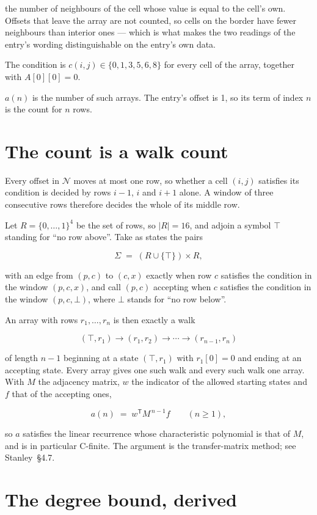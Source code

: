 \documentclass[11pt]{article}
\theoremstyle{definition}
\begin{document}
the number of neighbours of the cell whose value is equal to the cell's own. Offsets that leave the array are not counted, so cells on the border have fewer neighbours than interior ones --- which is what makes the two readings of the entry's wording distinguishable on the entry's own data.

The condition is $c(i,j) \in \{0, 1, 3, 5, 6, 8\}$ for every cell of the array, together with $A[0][0]=0$.

$a(n)$ is the number of such arrays. The entry's offset is 1, so its term of index $n$ is the count for $n$ rows.

\section{The count is a walk count}

Every offset in $\mathcal{N}$ moves at most one row, so whether a cell $(i,j)$ satisfies its condition is decided by rows $i-1$, $i$ and $i+1$ alone. A window of three consecutive rows therefore decides the whole of its middle row.

Let $R = \{0,\dots,1\}^{4}$ be the set of rows, so $|R| = 16$, and adjoin a symbol $\top$ standing for ``no row above''. Take as states the pairs

\[\Sigma \;=\; (R \cup \{\top\}) \times R,\]

with an edge from $(p,c)$ to $(c,x)$ exactly when row $c$ satisfies the condition in the window $(p,c,x)$, and call $(p,c)$ accepting when $c$ satisfies the condition in the window $(p,c,\bot)$, where $\bot$ stands for ``no row below''.

An array with rows $r_1,\dots,r_n$ is then exactly a walk

\[(\top,r_1) \to (r_1,r_2) \to \cdots \to (r_{n-1},r_n)\]

of length $n-1$ beginning at a state $(\top,r_1)$ with $r_1[0]=0$ and ending at an accepting state. Every array gives one such walk and every such walk one array. With $M$ the adjacency matrix, $w$ the indicator of the allowed starting states and $f$ that of the accepting ones,

\[a(n) \;=\; w^{\mathsf T} M^{\,n-1} f \qquad (n \ge 1),\]

so $a$ satisfies the linear recurrence whose characteristic polynomial is that of $M$, and is in particular C-finite. The argument is the transfer-matrix method; see Stanley~\S4.7.

\section{The degree bound, derived}
\end{document}
